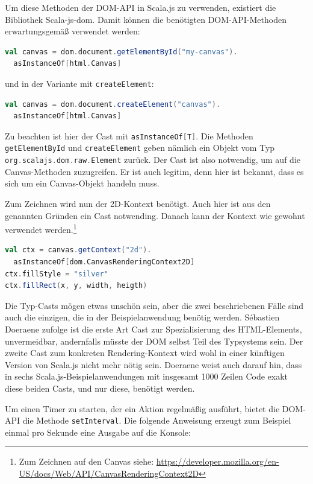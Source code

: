 \documentclass[a4paper, 12pt, hidelinks, listof=totoc, listoftables=totoc, bibliography=totoc]{scrreprt}
\newcommand{\scala}[1]{\lstinline[language=Scala, style=inline]|#1|}
\begin{document}
Um diese Methoden der \ac{DOM}-\ac{API} in Scala.js zu verwenden, existiert die Bibliothek Scala-js-dom. Damit können die benötigten \ac{DOM}-\ac{API}-Methoden erwartungsgemäß verwendet werden:

\begin{lstlisting}[language=Scala, style=snippet]
val canvas = dom.document.getElementById("my-canvas").
  asInstanceOf[html.Canvas]
\end{lstlisting}

und in der Variante mit \scala{createElement}:

\begin{lstlisting}[language=Scala, style=snippet]
val canvas = dom.document.createElement("canvas").
  asInstanceOf[html.Canvas]
\end{lstlisting}

Zu beachten ist hier der Cast mit \scala{asInstanceOf[T]}. Die Methoden \scala{getElementById} und \scala{createElement}
geben nämlich ein Objekt vom Typ \scala{org.scalajs.dom.raw.Element} zurück. Der Cast ist also notwendig, um auf die Canvas-Methoden zuzugreifen. Er ist auch legitim, denn hier ist bekannt, dass es sich um ein Canvas-Objekt handeln muss.

Zum Zeichnen wird nun der 2D-Kontext benötigt. Auch hier ist aus den genannten Gründen ein Cast notwending. Danach kann der Kontext wie gewohnt verwendet werden.\footnote{Zum Zeichnen auf den Canvas siehe: \url{https://developer.mozilla.org/en-US/docs/Web/API/CanvasRenderingContext2D}}

\begin{lstlisting}[language=Scala, style=snippet]
val ctx = canvas.getContext("2d").
  asInstanceOf[dom.CanvasRenderingContext2D]
ctx.fillStyle = "silver"
ctx.fillRect(x, y, width, heigth)
\end{lstlisting}

Die Typ-Casts mögen etwas unschön sein, aber die zwei beschriebenen Fälle sind auch die einzigen, die in der Beispielanwendung benötig werden. Sébastien Doeraene zufolge ist die erste Art Cast zur Spezialisierung des HTML-Elements, unvermeidbar, andernfalls müsste der \ac{DOM} selbst Teil des Typsystems sein. Der zweite Cast zum konkreten Rendering-Kontext wird wohl in einer künftigen Version von Scala.js nicht mehr nötig sein. Doeraene weist auch darauf hin, dass in sechs Scala.js-Beispielanwendungen mit insgesamt 1000 Zeilen Code exakt diese beiden Casts, und nur diese, benötigt werden.\cite[S. 8]{doeraene2013.TDI}

Um einen Timer zu starten, der ein Aktion regelmäßig ausführt, bietet die \ac{DOM}-\ac{API} die Methode \scala{setInterval}. Die folgende Anweisung erzeugt zum Beispiel einmal pro Sekunde eine Ausgabe auf die Konsole:
\end{document}
